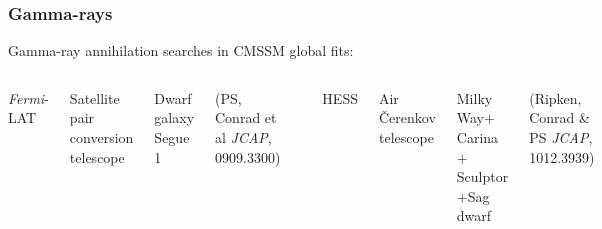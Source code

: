 \documentclass[xcolor=dvipsnames]{beamer}
\newcommand{\cblue}[1]{{\color[rgb]{0.1, 0.0, 0.6} #1}}
\begin{document}
\begin{frame}
\frametitle{Gamma-rays}

Gamma-ray annihilation searches in CMSSM global fits: 
\vspace{3mm}

\begin{columns}[c]

\cblue{\textit{Fermi}-LAT}

{\footnotesize
Satellite pair conversion telescope

Dwarf galaxy Segue 1\vspace{2mm}

{\tiny (PS, Conrad et al {\it JCAP}, 0909.3300)}

\includegraphics[height=0.6\textwidth, trim = 20 182 20 220, clip=true]{B50_H0_All_P_lin_2D_profl_7}

}

\cblue{HESS}

{\footnotesize
Air \v{C}erenkov telescope

Milky Way$+$Carina$+$Sculptor$+$Sag dwarf\vspace{2mm}

{\tiny(Ripken, Conrad \& PS {\it JCAP}, 1012.3939)}\vspace{2mm}

}
\end{columns}
\end{frame}
\end{document}
